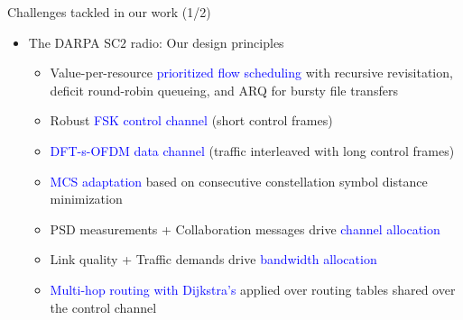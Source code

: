\documentclass{beamer}
\begin{document}
\begin{frame}{Challenges tackled in our work (1/2)}
\begin{itemize}
    \item The DARPA SC$2$ radio: Our design principles
    \begin{itemize}
        \item Value-per-resource \textcolor{blue}{prioritized flow scheduling} with recursive revisitation, deficit round-robin queueing, and ARQ for bursty file transfers
        \item Robust \textcolor{blue}{FSK control channel} (short control frames) \item \textcolor{blue}{DFT-s-OFDM data channel} (traffic interleaved with long control frames)
        \item \textcolor{blue}{MCS adaptation} based on consecutive constellation symbol distance minimization
        \item PSD measurements + Collaboration messages drive \textcolor{blue}{channel allocation}
        \item Link quality + Traffic demands drive \textcolor{blue}{bandwidth allocation}
        \item \textcolor{blue}{Multi-hop routing with Dijkstra's} applied over routing tables shared over the control channel
    \end{itemize}
\end{itemize}
\end{frame}
\end{document}

